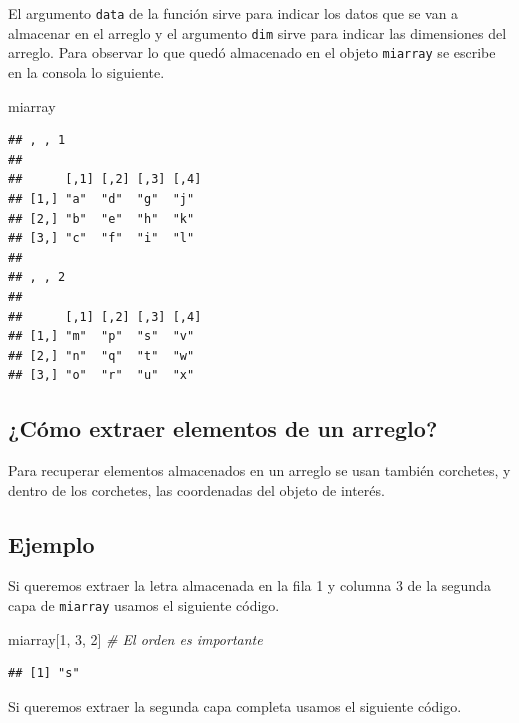 \documentclass[10pt,]{krantz}
\makeatletter
\newenvironment{Shaded}{\begin{snugshade}}{\end{snugshade}}
\newcommand{\DecValTok}[1]{\textcolor[rgb]{0.00,0.00,0.81}{{#1}}}
\newcommand{\CommentTok}[1]{\textcolor[rgb]{0.56,0.35,0.01}{\textit{{#1}}}}
\newcommand{\NormalTok}[1]{{#1}}
\newenvironment{kframe}{%
\medskip{}
\setlength{\fboxsep}{.8em}
 \def\at@end@of@kframe{}%
 \ifinner\ifhmode%
  \def\at@end@of@kframe{\end{minipage}}%
  \begin{minipage}{\columnwidth}%
 \fi\fi%
 \def\FrameCommand##1{\hskip\@totalleftmargin \hskip-\fboxsep
 \colorbox{shadecolor}{##1}\hskip-\fboxsep
     \hskip-\linewidth \hskip-\@totalleftmargin \hskip\columnwidth}%
 \MakeFramed {\advance\hsize-\width
   \@totalleftmargin\z@ \linewidth\hsize
   \@setminipage}}%
 {\par\unskip\endMakeFramed%
 \at@end@of@kframe}
\renewenvironment{Shaded}{\begin{kframe}}{\end{kframe}}
\makeatother
\begin{document}
El argumento \texttt{data} de la función sirve para indicar los datos
que se van a almacenar en el arreglo y el argumento \texttt{dim} sirve
para indicar las dimensiones del arreglo. Para observar lo que quedó
almacenado en el objeto \texttt{miarray} se escribe en la consola lo
siguiente.

\begin{Shaded}
\begin{Highlighting}[]
\NormalTok{miarray}
\end{Highlighting}
\end{Shaded}

\begin{verbatim}
## , , 1
## 
##      [,1] [,2] [,3] [,4]
## [1,] "a"  "d"  "g"  "j" 
## [2,] "b"  "e"  "h"  "k" 
## [3,] "c"  "f"  "i"  "l" 
## 
## , , 2
## 
##      [,1] [,2] [,3] [,4]
## [1,] "m"  "p"  "s"  "v" 
## [2,] "n"  "q"  "t"  "w" 
## [3,] "o"  "r"  "u"  "x"
\end{verbatim}

\subsection{¿Cómo extraer elementos de un
arreglo?}\label{como-extraer-elementos-de-un-arreglo}

Para recuperar elementos almacenados en un arreglo se usan también
corchetes, y dentro de los corchetes, las coordenadas del objeto de
interés.

\subsection*{Ejemplo}\label{ejemplo-2}


Si queremos extraer la letra almacenada en la fila 1 y columna 3 de la
segunda capa de \texttt{miarray} usamos el siguiente código.

\begin{Shaded}
\begin{Highlighting}[]
\NormalTok{miarray[}\DecValTok{1}\NormalTok{, }\DecValTok{3}\NormalTok{, }\DecValTok{2}\NormalTok{]  }\CommentTok{# El orden es importante}
\end{Highlighting}
\end{Shaded}

\begin{verbatim}
## [1] "s"
\end{verbatim}

Si queremos extraer la segunda capa completa usamos el siguiente código.
\end{document}
